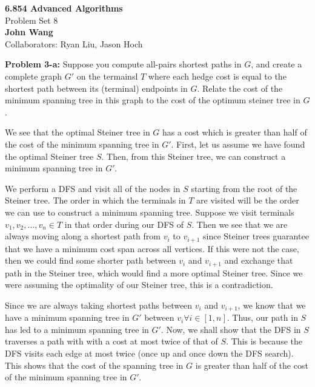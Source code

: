 \documentclass[psamsfonts]{amsart}
\newenvironment{sol}{\vspace{0.25cm}{\large \bfseries Solution:}}{\qedsymbol}
\newenvironment{prob}[1]{\begin{framed}{\large \bfseries Problem #1:}}{\end{framed}}
\newcommand{\makenewtitle}{
    \begin{center}
    {\huge \bfseries 6.854 Advanced Algorithms} \\
    Problem Set 8\\
    \vspace{0.25cm}
    {\bfseries John Wang} \\
    Collaborators: Ryan Liu, Jason Hoch 
    \end{center}
    \vspace{0.5cm}
}
\begin{document}
\newpage
\makenewtitle

\begin{prob}{3-a}
Suppose you compute all-pairs shortest paths in $G$, and create a complete graph $G'$ on the termainsl $T$ where each hedge cost is equal to the shortest path between its (terminal) endpoints in $G$. Relate the cost of the minimum spanning tree in this graph to the cost of the optimum steiner tree in $G$. 
\end{prob}
\begin{sol}
We see that the optimal Steiner tree in $G$ has a cost which is greater than half of the cost of the minimum spanning tree in $G'$. First, let us assume we have found the optimal Steiner tree $S$. Then, from this Steiner tree, we can construct a minimum spanning tree in $G'$. 

We perform a DFS and visit all of the nodes in $S$ starting from the root of the Steiner tree. The order in which the terminals in $T$ are visited will be the order we can use to construct a minimum spanning tree. Suppose we visit terminals $v_1, v_2, \ldots, v_n \in T$ in that order during our DFS of $S$. Then we see that we are always moving along a shortest path from $v_i$ to $v_{i+1}$ since Steiner trees guarantee that we have a minimum cost span across all vertices. If this were not the case, then we could find some shorter path between $v_i$ and $v_{i+1}$ and exchange that path in the Steiner tree, which would find a more optimal Steiner tree. Since we were assuming the optimality of our Steiner tree, this is a contradiction. 

Since we are always taking shortest paths between $v_{i}$ and $v_{i+1}$, we know that we have a minimum spanning tree in $G'$ between $v_{i} \forall i \in [1, n]$. Thus, our path in $S$ has led to a minimum spanning tree in $G'$. Now, we shall show that the DFS in $S$ traverses a path with with a cost at most twice of that of $S$. This is because the DFS visits each edge at most twice (once up and once down the DFS search). This shows that the cost of the spanning tree in $G$ is greater than half of the cost of the minimum spanning tree in $G'$. 
\end{sol}
\end{document}
